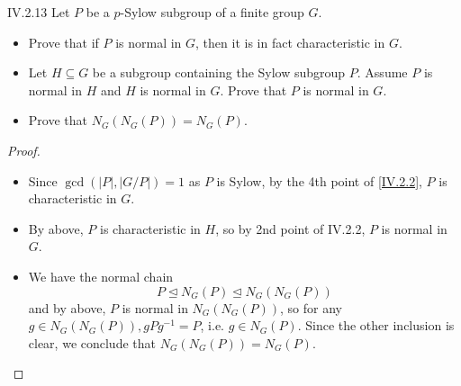 \begin{problem}{IV.2.13}
Let $P$ be a $p$-Sylow subgroup of a finite group $G$.
\begin{itemize}
\setlength\itemsep{0pt}
\item Prove that if $P$ is normal in $G$, then it is in fact characteristic in $G$.
\item Let $H \subseteq G$ be a subgroup containing the Sylow subgroup $P$. Assume $P$ is normal in $H$ and $H$ is normal in $G$. Prove that $P$ is normal in $G$.
\item Prove that $N_G(N_G(P)) = N_G(P)$.
\end{itemize}
\end{problem}
\begin{proof} \
\begin{itemize}
\setlength\itemsep{0pt}
\item Since $\gcd(|P|, |G/P|) = 1$ as $P$ is Sylow, by the 4th point of \ref{IV.2.2}, $P$ is characteristic in $G$.
\item By above, $P$ is characteristic in $H$, so by 2nd point of IV.2.2, $P$ is normal in $G$.
\item We have the normal chain
\[
P \trianglelefteq N_G(P) \trianglelefteq N_G(N_G(P))	
\]
and by above, $P$ is normal in $N_G(N_G(P))$, so for any $g \in N_G(N_G(P)), gPg^{-1} = P$, i.e. $g \in N_G(P)$. Since the other inclusion is clear, we conclude that $N_G(N_G(P)) = N_G(P)$. 
\end{itemize}
\end{proof}

